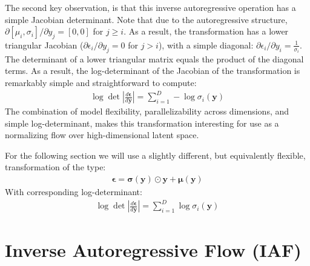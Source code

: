 \documentclass[MAL,biber]{nowfnt} %
\newcommand{\bb}[1]{\mathbf{#1}}
\newcommand{\by}{\bb{y}}
\newcommand{\bepsilon}{\boldsymbol{\epsilon}}
\newcommand{\bsigma}{\boldsymbol{\sigma}}
\newcommand{\bmu}{\boldsymbol{\mu}}
\begin{document}
The second key observation, is that this inverse autoregressive operation has a simple Jacobian determinant. Note that due to the autoregressive structure, $\partial [\mu_i, \sigma_i] / \partial y_j = [0,0]$ for $j \geq i$. As a result, the transformation has a lower triangular Jacobian ($\partial \epsilon_i / \partial y_j = 0$ for $j>i$), with a simple diagonal: $\partial \epsilon_i / \partial y_i = \frac{1}{\sigma_i}$. The determinant of a lower triangular matrix equals the product of the diagonal terms. As a result, the log-determinant of the Jacobian of the transformation is remarkably simple and straightforward to compute:
\begin{align}
\log \det \left| \frac{d\bepsilon}{d\by} \right| = \sum_{i=1}^D - \log \sigma_{i}(\by)
\end{align}
The combination of model flexibility, parallelizability across dimensions, and simple log-determinant, makes this transformation interesting for use as a normalizing flow over high-dimensional latent space.

For the following section we will use a slightly different, but equivalently flexible, transformation of the type:
\begin{align}
\bepsilon = \bsigma(\by) \odot \by + \bmu(\by)
\label{eq:whitening2}
\end{align}
With corresponding log-determinant:
\begin{align}
\log \det \left| \frac{d\bepsilon}{d\by} \right| = \sum_{i=1}^D \log \sigma_{i}(\by)
\end{align}

\section{Inverse Autoregressive Flow (IAF)}
\end{document}
